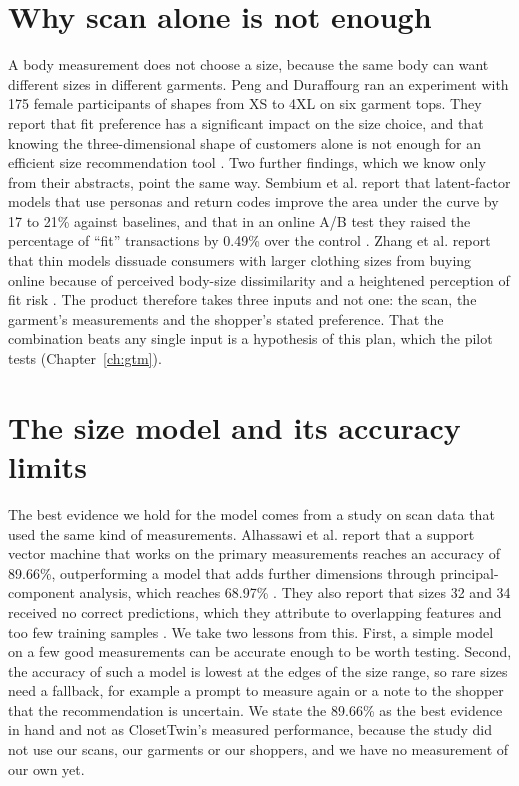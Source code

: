 \section{Why scan alone is not enough}\label{sec:product-pref}

A body measurement does not choose a size, because the same body can want different sizes in different garments. Peng and Duraffourg ran an experiment with 175 female participants of shapes from XS to 4XL on six garment tops. They report that fit preference has a significant impact on the size choice, and that knowing the three-dimensional shape of customers alone is not enough for an efficient size recommendation tool \cite{peng2023}. Two further findings, which we know only from their abstracts, point the same way. Sembium et al. report that latent-factor models that use personas and return codes improve the area under the curve by 17 to 21\% against baselines, and that in an online A/B test they raised the percentage of ``fit'' transactions by 0.49\% over the control \cite{sembium2017}. Zhang et al. report that thin models dissuade consumers with larger clothing sizes from buying online because of perceived body-size dissimilarity and a heightened perception of fit risk \cite{zhang2024}. The product therefore takes three inputs and not one: the scan, the garment's measurements and the shopper's stated preference. That the combination beats any single input is a hypothesis of this plan, which the pilot tests (Chapter~\ref{ch:gtm}).

\section{The size model and its accuracy limits}\label{sec:product-model}

The best evidence we hold for the model comes from a study on scan data that used the same kind of measurements. Alhassawi et al. report that a support vector machine that works on the primary measurements reaches an accuracy of 89.66\%, outperforming a model that adds further dimensions through principal-component analysis, which reaches 68.97\% \cite{alhassawi2025}. They also report that sizes 32 and 34 received no correct predictions, which they attribute to overlapping features and too few training samples \cite{alhassawi2025}. We take two lessons from this. First, a simple model on a few good measurements can be accurate enough to be worth testing. Second, the accuracy of such a model is lowest at the edges of the size range, so rare sizes need a fallback, for example a prompt to measure again or a note to the shopper that the recommendation is uncertain. We state the 89.66\% as the best evidence in hand and not as ClosetTwin's measured performance, because the study did not use our scans, our garments or our shoppers, and we have no measurement of our own yet.

